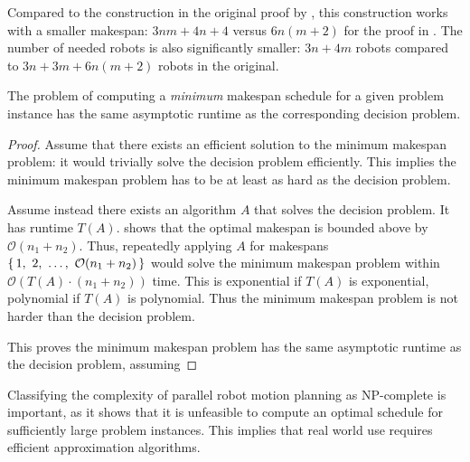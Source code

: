 Compared to the construction in the original proof by \cite{siamcomp/DemaineFKMS19}, this construction works with a smaller makespan: \(3nm + 4n + 4\) versus \(6n(m + 2)\) for the proof in \cite{siamcomp/DemaineFKMS19}. 
The number of needed robots is also significantly smaller: \(3n + 4m\) robots compared to \(3n + 3m + 6n(m + 2)\) robots in the original. 

\begin{corollary}
	The problem of computing a \emph{minimum} makespan schedule for a given problem instance has the same asymptotic runtime as the corresponding decision problem. 
\end{corollary}

\begin{proof}
	Assume that there exists an efficient solution to the minimum makespan problem: it would trivially solve the decision problem efficiently. This implies the minimum makespan problem has to be at least as hard as the decision problem. 

	
	Assume instead there exists an algorithm \(A\) that solves the decision problem. 
	It has runtime \(T(A)\). 
	\cite{siamcomp/DemaineFKMS19} shows that the optimal makespan is bounded above by \(\mathcal{O}(n_1 + n_2)\). 
	Thus, repeatedly applying \(A\) for makespans \(\set{1,\ 2,\ \dots,\ \mathcal{O}(n_1 + n_2)}\) would solve the minimum makespan problem within \(\mathcal{O}(T(A) \cdot (n_1 + n_2) )\) time. 
	This is exponential if \(T(A)\) is exponential, polynomial if \(T(A)\) is polynomial. 
	Thus the minimum makespan problem is not harder than the decision problem. 

	This proves the minimum makespan problem has the same asymptotic runtime as the decision problem, assuming 
\end{proof} 

Classifying the complexity of parallel robot motion planning as NP-complete is important, as it shows that it is unfeasible to compute an optimal schedule for sufficiently large problem instances. 
This implies that real world use requires efficient approximation algorithms.


